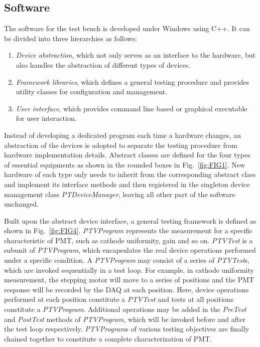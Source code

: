 \documentclass[a4paper,10pt,twoside]{cpc-hepnp}
\begin{document}
\begin{CJK*}{UTF8}{gbsn}
\begin{multicols}{2}
\subsection{Software}
\label{sec:software}

The software for the test bench is developed under Windows using C++. It can be divided into three hierarchies as follows:
\begin{enumerate}
	\item \textit{Device abstraction}, which not only serves as an interface to the hardware, but also handles the abstraction of different types of devices. 
	\item \textit{Framework libraries}, which defines a general testing procedure and provides utility classes for configuration and management.
	\item \textit{User interface}, which provides command line based or graphical executable for user interaction. 
\end{enumerate}

Instead of developing a dedicated program each time a hardware changes, an abstraction of the devices is adopted to separate the testing procedure from hardware implementation details. 
Abstract classes are defined for the four types of essential equipments as shown in the rounded boxes in Fig.~\ref{fig:FIG1}.
New hardware of each type only needs to inherit from the corresponding abstract class and implement its interface methods and then registered in the singleton device management class \textit{PTDeviceManager}, leaving all other part of the software unchanged.
	
Built upon the abstract device interface, a general testing framework is defined as shown in Fig.~\ref{fig:FIG4}.
\textit{PTVProgram} represents the measurement for a specific characteristic of PMT, such as cathode uniformity, gain and so on.
\textit{PTVTest} is a subunit of \textit{PTVProgram}, which encapsulates the real device operations performed under a specific condition.
A \textit{PTVProgram} may consist of a series of \textit{PTVTest}s, which are invoked sequentially in a test loop.
For example, in cathode uniformity measurement, the stepping motor will move to a series of positions and the PMT response will be recorded by the DAQ at each position.
Here, device operations performed at each position constitute a \textit{PTVTest} and tests at all positions constitute a \textit{PTVProgram}.
Additional operations may be added in the \textit{PreTest} and \textit{PostTest} methods of \textit{PTVProgram}, which will be invoked before and after the test loop respectively.
\textit{PTVProgram}s of various testing objectives are finally chained together to constitute a complete characterization of PMT.


\end{multicols}
\end{CJK*}
\end{document}
